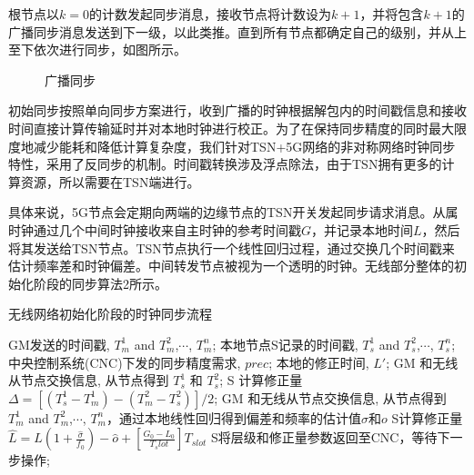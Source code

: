 \documentclass[UTF8,a4paper,12pt]{ctexart}
\numberwithin{equation}{section}
\begin{document}
根节点以$k=0$的计数发起同步消息，接收节点将计数设为$k+1$，并将包含$k+1$的广播同步消息发送到下一级，以此类推。直到所有节点都确定自己的级别，并从上至下依次进行同步，如图所示。
\begin{figure}[htb]
	\caption{\label{1} 广播同步}
\end{figure}


初始同步按照单向同步方案进行，收到广播的时钟根据解包内的时间戳信息和接收时间直接计算传输延时并对本地时钟进行校正。为了在保持同步精度的同时最大限度地减少能耗和降低计算复杂度，我们针对TSN+5G网络的非对称网络时钟同步特性，采用了反同步的机制\cite{8935413}。时间戳转换涉及浮点除法，由于TSN拥有更多的计算资源，所以需要在TSN端进行。

具体来说，5G节点会定期向两端的边缘节点的TSN开关发起同步请求消息。从属时钟通过几个中间时钟接收来自主时钟的参考时间戳$G$，并记录本地时间$L$，然后将其发送给TSN节点。TSN节点执行一个线性回归过程，通过交换几个时间戳来估计频率差和时钟偏差。中间转发节点被视为一个透明的时钟。无线部分整体的初始化阶段的同步算法2所示。
\begin{algorithm}[ht]  
	\caption{无线网络初始化阶段的时钟同步流程}  
	\begin{algorithmic}[1]
		\REQUIRE GM发送的时间戳, $T_m^1$ and $T_m^2$,$\cdots$, $T_m^n$; 本地节点S记录的时间戳, $T_s^1$ and $T_s^2$,$\cdots$, $T_s^n$; 中央控制系统(CNC)下发的同步精度需求, $prec$;
		\ENSURE 本地的修正时间, $L'$;
		\STATE GM 和无线从节点交换信息, 从节点得到 $T_s^1$ 和 $T_s^2$; 
		\STATE S 计算修正量 $\Delta = [(T_s^1 - T_m^1) - (T_m^2 - T_s^2)]/2$;
		\ELSE  
		\STATE GM 和无线从节点交换信息, 从节点得到 $T_m^1$ and $T_m^2$,$\cdots$, $T_m^n$，通过本地线性回归得到偏差和频率的估计值$\sigma$和$o$	
		\STATE S计算修正量$\widehat{L}=L(1+\frac{\widehat{\sigma}}{f_0})-\widehat{o}+[\frac{G_0-L_0}{T_slot}]T_{slot}$			
		\ENDIF
		\STATE S将层级和修正量参数返回至CNC，等待下一步操作;
		\ENDWHILE
		\ENDWHILE
	\end{algorithmic}
\end{algorithm}
\end{document}
